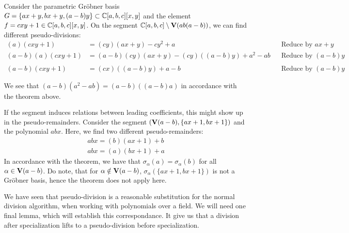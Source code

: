 \begin{example}\upshape
  Consider the parametric Gröbner basis $G = \{ ax + y, bx + y, (a - b)y \} \subset \mathbb{C}[a, b, c][x, y]$ and the element $f = cxy + 1 \in \mathbb{C}[a, b, c][x, y]$. On the segment $\mathbb{C}[a, b, c] \setminus \operatorname{\mathbf V}(ab(a-b))$, we can find different pseudo-divisions:
  \begin{align*}
    (a)(cxy + 1) &= (cy)(ax + y) - cy^{2} + a  && \text{Reduce by $ax + y$} \\
    (a-b)(a)(cxy + 1) &= (a-b)(cy)(ax + y) - (cy)((a - b)y) + a^{2} - ab && \text{Reduce by $(a - b)y$} \\
    & && \\
    (a-b)(cxy + 1) &= (cx)((a-b)y) + a - b && \text{Reduce by $(a - b)y$}
  \end{align*}

  We see that $(a-b)(a^{2} - ab) = (a - b)((a-b)a)$ in accordance with the theorem above.

  If the segment induces relations between leading coefficients, this might show up in the pseudo-remainders. Consider the segment $(\operatorname{\mathbf V}(a - b), \{ax + 1, bx + 1\})$ and the polynomial $abx$. Here, we find two different pseudo-remainders:
  \begin{align*}
    abx = (b)(ax + 1) + b \\
    abx = (a)(bx + 1) + a
  \end{align*}
  In accordance with the theorem, we have that $\sigma_{\alpha}(a) = \sigma_{\alpha}(b)$ for all $\alpha \in \operatorname{\mathbf V}(a - b)$. Do note, that for $\alpha \notin \operatorname{\mathbf V}(a - b)$, $\sigma_{\alpha}(\{ax + 1, bx + 1\})$ is not a Gröbner basis, hence the theorem does not apply here.
\end{example}

We have seen that pseudo-division is a reasonable substitution for the normal division algorithm, when working with polynomials over a field. We will need one final lemma, which will establish this correspondance. It give us that a division after specialization lifts to a pseudo-division before specialization.

